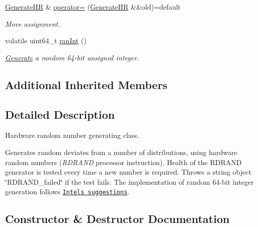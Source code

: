 \begin{DoxyCompactItemize}
\hyperlink{classsamp_files_1_1_generate_h_r}{Generate\+HR} \& \hyperlink{classsamp_files_1_1_generate_h_r_aa415dd128cd0de2e567e86cb375bc919}{operator=} (\hyperlink{classsamp_files_1_1_generate_h_r}{Generate\+HR} \&\&old)=default
\begin{DoxyCompactList}\small\item\em Move assignment. \end{DoxyCompactList}\item 
volatile uint64\+\_\+t \hyperlink{classsamp_files_1_1_generate_h_r_ac0c560c9ea17bc67470124040e0bd796}{ran\+Int} ()
\begin{DoxyCompactList}\small\item\em \hyperlink{classsamp_files_1_1_generate}{Generate} a random 64-\/bit unsigned integer. \end{DoxyCompactList}\end{DoxyCompactItemize}
\subsection*{Additional Inherited Members}


\subsection{Detailed Description}
Hardware random number generating class. 

Generates random deviates from a number of distributions, using hardware random numbers ({\itshape R\+D\+R\+A\+ND} processor instruction). Health of the R\+D\+R\+A\+ND generator is tested every time a new number is required. Throws a {\ttfamily string} object \char`\"{}\+R\+D\+R\+A\+N\+D\+\_\+failed\char`\"{} if the test fails. The implementation of random 64-\/bit integer generation follows \href{https://software.intel.com/en-us/articles/intel-digital-random-number-generator-drng-software-implementation-guide}{\tt Intel\textquotesingle{}s suggestions}. 

\subsection{Constructor \& Destructor Documentation}
\mbox{\label{classsamp_files_1_1_generate_h_r_aae078758c8b83665628601feb63d956a}} 
